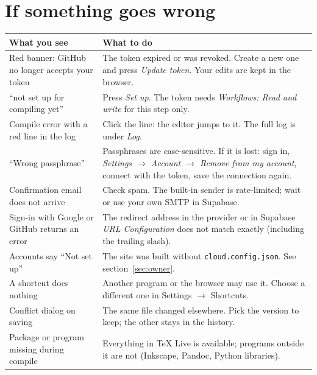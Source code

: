 \documentclass[11pt,a4paper]{article}
\newcommand{\fpath}[1]{\texttt{\small #1}}
\begin{document}
\section{If something goes wrong}
\begin{longtable}{@{}L{5.2cm}L{9.6cm}@{}}
\toprule
\textbf{What you see} & \textbf{What to do}\\\midrule\endhead
Red banner: GitHub no longer accepts your token & The token expired or was revoked. Create a new one and press \emph{Update token}. Your edits are kept in the browser.\\
``not set up for compiling yet'' & Press \emph{Set up}. The token needs \emph{Workflows: Read and write} for this step only.\\
Compile error with a red line in the log & Click the line: the editor jumps to it. The full log is under \emph{Log}.\\
``Wrong passphrase'' & Passphrases are case-sensitive. If it is lost: sign in, \emph{Settings $\rightarrow$ Account $\rightarrow$ Remove from my account}, connect with the token, save the connection again.\\
Confirmation email does not arrive & Check spam. The built-in sender is rate-limited; wait or use your own SMTP in Supabase.\\
Sign-in with Google or GitHub returns an error & The redirect address in the provider or in Supabase \emph{URL Configuration} does not match exactly (including the trailing slash).\\
Accounts say ``Not set up'' & The site was built without \fpath{cloud.config.json}. See section~\ref{sec:owner}.\\
A shortcut does nothing & Another program or the browser may use it. Choose a different one in Settings $\rightarrow$ Shortcuts.\\
Conflict dialog on saving & The same file changed elsewhere. Pick the version to keep; the other stays in the history.\\
Package or program missing during compile & Everything in \TeX{} Live is available; programs outside it are not (Inkscape, Pandoc, Python libraries).\\
\bottomrule
\end{longtable}
\end{document}
